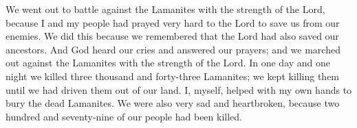 We went out to battle against the Lamanites with the strength of the Lord, because I and my people had prayed very hard to the Lord to save us from our enemies. We did this because we remembered that the Lord had also saved our ancestors.
\bverse \iffalse And God did hear our cries and did answer our prayers; and we did go forth in his might; yea, we did go forth against the Lamanites, and in one day and a night we did slay three thousand and forty-three; we did slay them even until we had driven them out of our land. \fi
And God heard our cries and answered our prayers; and we marched out against the Lamanites with the strength of the Lord. In one day and one night we killed three thousand and forty-three Lamanites; we kept killing them until we had driven them out of our land.
\bverse \iffalse And I, myself, with mine own hands, did help to bury their dead. And behold, to our great sorrow and lamentation, two hundred and seventy-nine of our brethren were slain. \fi
I, myself, helped with my own hands to bury the dead Lamanites. We were also very sad and heartbroken, because two hundred and seventy-nine of our people had been killed.

